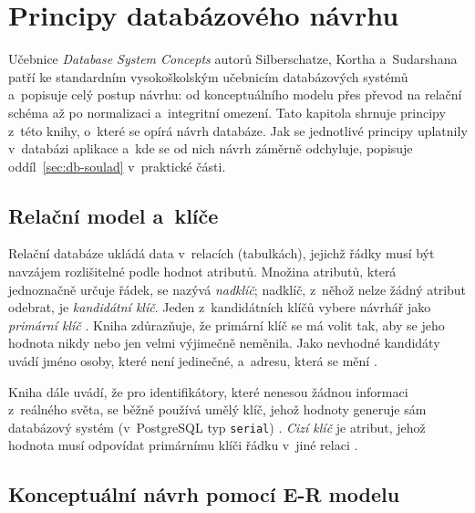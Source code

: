 \chapter{Principy databázového návrhu}\label{kap:principy-db}

Učebnice \emph{Database System Concepts} autorů Silberschatze, Kortha a~Sudarshana \cite{Silberschatz2020} patří ke standardním vysokoškolským učebnicím databázových systémů a~popisuje celý postup návrhu: od konceptuálního modelu přes převod na relační schéma až po normalizaci a~integritní omezení. Tato kapitola shrnuje principy z~této knihy, o~které se opírá návrh databáze. Jak se jednotlivé principy uplatnily v~databázi aplikace a~kde se od nich návrh záměrně odchyluje, popisuje oddíl~\ref{sec:db-soulad} v~praktické části.

\section{Relační model a~klíče}\label{sec:principy-klice}

Relační databáze ukládá data v~relacích (tabulkách), jejichž řádky musí být navzájem rozlišitelné podle hodnot atributů. Množina atributů, která jednoznačně určuje řádek, se nazývá \emph{nadklíč}; nadklíč, z~něhož nelze žádný atribut odebrat, je \emph{kandidátní klíč}. Jeden z~kandidátních klíčů vybere návrhář jako \emph{primární klíč} \cite[s.~43--44]{Silberschatz2020}. Kniha zdůrazňuje, že primární klíč se má volit tak, aby se jeho hodnota nikdy nebo jen velmi výjimečně neměnila. Jako nevhodné kandidáty uvádí jméno osoby, které není jedinečné, a~adresu, která se mění \cite[s.~44--45]{Silberschatz2020}.

Kniha dále uvádí, že pro identifikátory, které nenesou žádnou informaci z~reálného světa, se běžně používá umělý klíč, jehož hodnoty generuje sám databázový systém (v~PostgreSQL typ \texttt{serial}) \cite[s.~160--161]{Silberschatz2020}. \emph{Cizí klíč} je atribut, jehož hodnota musí odpovídat primárnímu klíči řádku v~jiné relaci \cite[s.~45]{Silberschatz2020}.

\section{Konceptuální návrh pomocí E-R modelu}\label{sec:principy-er}

